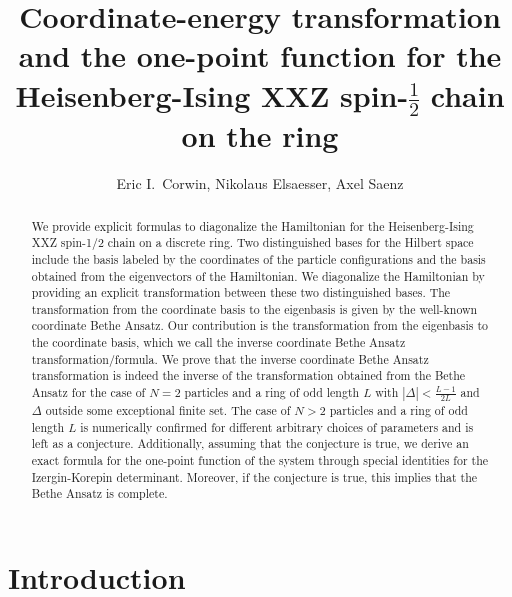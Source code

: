 \documentclass[a4paper,11pt]{article}
\theoremstyle{definition}
\begin{document}
	
\title{Coordinate-energy transformation and the one-point function for the Heisenberg-Ising XXZ spin-$\tfrac{1}{2}$ chain on the ring}
\author{Eric I.~Corwin, Nikolaus Elsaesser, Axel Saenz}

\date{}
\maketitle

\begin{abstract}
We provide explicit formulas to diagonalize the Hamiltonian for the Heisenberg-Ising XXZ spin-1/2 chain on a discrete ring. Two distinguished bases for the Hilbert space include the basis labeled by the coordinates of the particle configurations and the basis obtained from the eigenvectors of the Hamiltonian. We diagonalize the Hamiltonian by providing an explicit transformation between these two distinguished bases. The transformation from the coordinate basis to the eigenbasis is given by the well-known coordinate Bethe Ansatz. Our contribution is the transformation from the eigenbasis to the coordinate basis, which we call the inverse coordinate Bethe Ansatz transformation/formula. We prove that the inverse coordinate Bethe Ansatz transformation is indeed the inverse of the transformation obtained from the Bethe Ansatz for the case of $N=2$ particles and a ring of odd length $L$ with $|\Delta|<\frac{L-1}{2L}$ and $\Delta$ outside some exceptional finite set. The case of $N>2$ particles and a ring of odd length $L$ is numerically confirmed for different arbitrary choices of parameters and is left as a conjecture. Additionally, assuming that the conjecture is true, we derive an exact formula for the one-point function of the system through special identities for the Izergin-Korepin determinant. Moreover, if the conjecture is true, this implies that the Bethe Ansatz is complete. 

\end{abstract}


\tableofcontents

\section{Introduction}
\end{document}

